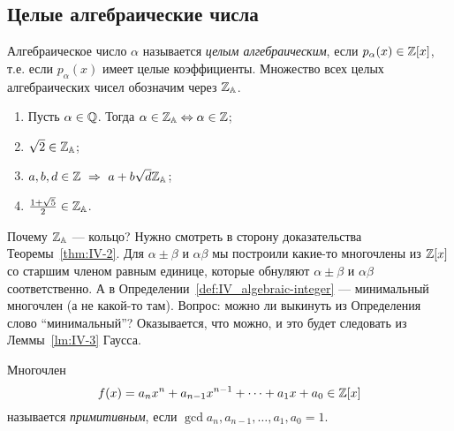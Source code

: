 \subsection{Целые алгебраические числа}
\label{subsec:IV-2}

\begin{ndefinition}
\label{def:IV_algebraic-integer}
    Алгебраическое число $\alpha$ называется \emph{целым алгебраическим}, если $p_{\alpha}(x) \in \mathbb{Z}[x]$, т.е. если $p_{\alpha}(x)$ имеет целые коэффициенты. Множество всех целых алгебраических чисел обозначим через $\mathbb{Z}_{\mathbb{A}}$.
\end{ndefinition}

\begin{example}
\hfill
    \begin{enumerate}
        \item
            Пусть $\alpha \in \mathbb{Q}$. Тогда $\alpha \in \mathbb{Z}_{\mathbb{A}} \Leftrightarrow \alpha \in \mathbb{Z}$;
        \item
            $\sqrt{2} \in \mathbb{Z}_{\mathbb{A}}$;
        \item
            $a, b, d \in \mathbb{Z} \ \Rightarrow \ a + b\sqrt{d} \mathbb{Z}_{\mathbb{A}}$;
        \item
            $\frac{1 + \sqrt{5}}{2} \in \mathbb{Z}_{\mathbb{A}}$.
    \end{enumerate}
\end{example}

\begin{remark}[Анонс!]
    Почему $\mathbb{Z}_{\mathbb{A}}$ --- кольцо? Нужно смотреть в сторону доказательства Теоремы~\ref{thm:IV-2}. Для $\alpha \pm \beta$ и $\alpha\beta$ мы построили какие-то многочлены из $\mathbb{Z}[x]$ со старшим членом равным единице, которые обнуляют $\alpha \pm \beta$ и $\alpha\beta$ соответственно. А в Определении~\ref{def:IV_algebraic-integer} --- минимальный многочлен (а не какой-то там). Вопрос: можно ли выкинуть из Определения слово ``минимальный''? Оказывается, что можно, и это будет следовать из Леммы~\ref{lm:IV-3} Гаусса.
\end{remark}

\begin{ndefinition}
\label{def:IV_primitive-polynomial}
    Многочлен 
    \[
        f(x) = a_nx^n + a_{n-1}x^{n-1} + \dots + a_1x + a_0 \in \mathbb{Z}[x]
    \]
    называется \emph{примитивным}, если $\gcd{a_n, a_{n-1}, \dots, a_1, a_0} = 1$.
\end{ndefinition}

